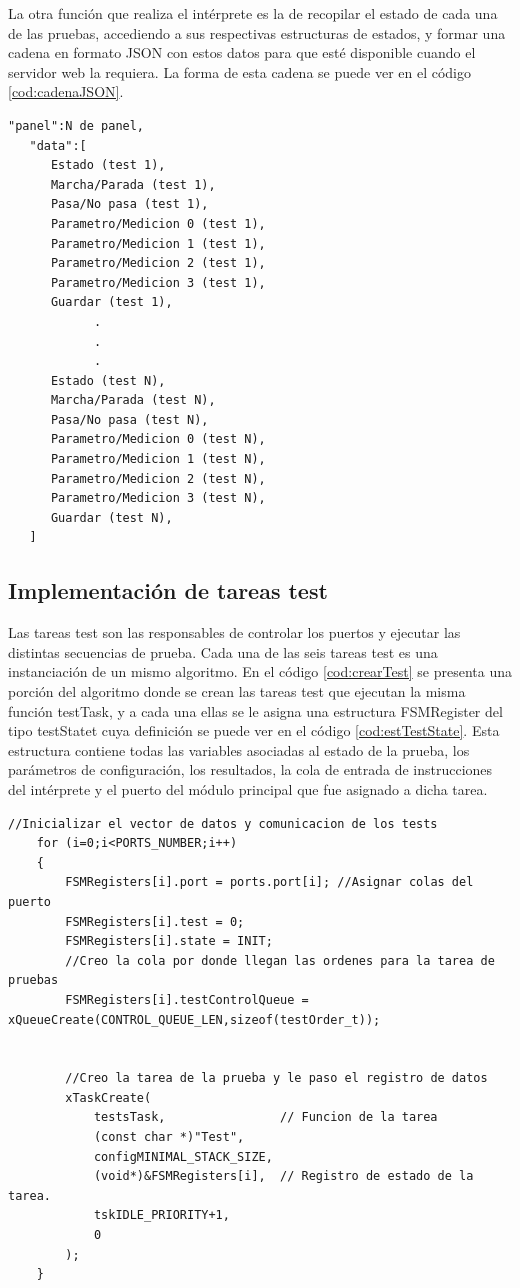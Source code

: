 La otra función que realiza el intérprete es la de recopilar el estado de cada una de las pruebas, accediendo a sus respectivas estructuras de estados, y formar una cadena en formato JSON con estos datos para que esté disponible cuando el servidor web la requiera.
La forma de esta cadena se puede ver en el código \ref{cod:cadenaJSON}.

\begin{lstlisting}[label=cod:cadenaJSON, caption= Cadena de datos de panel en notación JSON.]
   "panel":N de panel,
   "data":[
      Estado (test 1),
      Marcha/Parada (test 1),
      Pasa/No pasa (test 1),
      Parametro/Medicion 0 (test 1),
      Parametro/Medicion 1 (test 1),
      Parametro/Medicion 2 (test 1),
      Parametro/Medicion 3 (test 1),
      Guardar (test 1),
			.
			.
			.
      Estado (test N),
      Marcha/Parada (test N),
      Pasa/No pasa (test N),
      Parametro/Medicion 0 (test N),
      Parametro/Medicion 1 (test N),
      Parametro/Medicion 2 (test N),
      Parametro/Medicion 3 (test N),
      Guardar (test N),
   ]

\end{lstlisting}


\subsection{Implementación de tareas test}

Las tareas test son las responsables de controlar los puertos y ejecutar las distintas secuencias de prueba. Cada una de las seis tareas test es una instanciación de un mismo algoritmo. En el código \ref{cod:crearTest} se presenta una porción del algoritmo donde se crean las tareas test que ejecutan la misma función testTask, y a cada una ellas se le asigna una estructura FSMRegister del tipo testStatet cuya definición se puede ver en el código \ref{cod:estTestState}.
Esta estructura contiene todas las variables asociadas al estado de la prueba, los parámetros de configuración, los resultados, la cola de entrada de instrucciones del intérprete y el puerto del módulo principal que fue asignado a dicha tarea.


\begin{lstlisting}[label=cod:crearTest, caption= Algoritmo de creación de tareas test.]
//Inicializar el vector de datos y comunicacion de los tests
	for (i=0;i<PORTS_NUMBER;i++)
	{
		FSMRegisters[i].port = ports.port[i]; //Asignar colas del puerto
		FSMRegisters[i].test = 0;
		FSMRegisters[i].state = INIT;
		//Creo la cola por donde llegan las ordenes para la tarea de pruebas
		FSMRegisters[i].testControlQueue = xQueueCreate(CONTROL_QUEUE_LEN,sizeof(testOrder_t)); 


		//Creo la tarea de la prueba y le paso el registro de datos
		xTaskCreate(
			testsTask,                // Funcion de la tarea
			(const char *)"Test",     
			configMINIMAL_STACK_SIZE, 
			(void*)&FSMRegisters[i],  // Registro de estado de la tarea.
			tskIDLE_PRIORITY+1,         
			0                           
		);
	}


\end{lstlisting}


